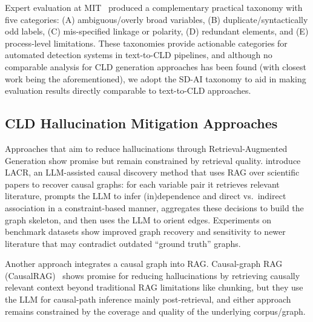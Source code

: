 Expert evaluation at MIT~\citep{reinholtz2025pipelinealgebra} produced a complementary practical taxonomy with five categories: (A) ambiguous/overly broad variables, (B) duplicate/syntactically odd labels, (C) mis-specified linkage or polarity, (D) redundant elements, and (E) process-level limitations. These taxonomies provide actionable categories for automated detection systems in text-to-CLD pipelines, and although no comparable analysis for CLD generation approaches has been found (with closest work being the aforementioned), we adopt the SD-AI taxonomy to aid in making evaluation results directly comparable to text-to-CLD approaches.

\subsection{CLD Hallucination Mitigation Approaches}

Approaches that aim to reduce hallucinations through Retrieval-Augmented Generation show promise but remain constrained by retrieval quality. \citet{zhang2024causal} introduce LACR, an LLM-assisted causal discovery method that uses RAG over scientific papers to recover causal graphs: for each variable pair it retrieves relevant literature, prompts the LLM to infer (in)dependence and direct vs.\ indirect association in a constraint-based manner, aggregates these decisions to build the graph skeleton, and then uses the LLM to orient edges. Experiments on benchmark datasets show improved graph recovery and sensitivity to newer literature that may contradict outdated ``ground truth'' graphs.

Another approach integrates a causal graph into RAG. Causal-graph RAG (CausalRAG)~\citep{wang2025causalrag} shows promise for reducing hallucinations by retrieving causally relevant context beyond traditional RAG limitations like chunking, but they use the LLM for causal-path inference mainly post-retrieval, and either approach remains constrained by the coverage and quality of the underlying corpus/graph.

